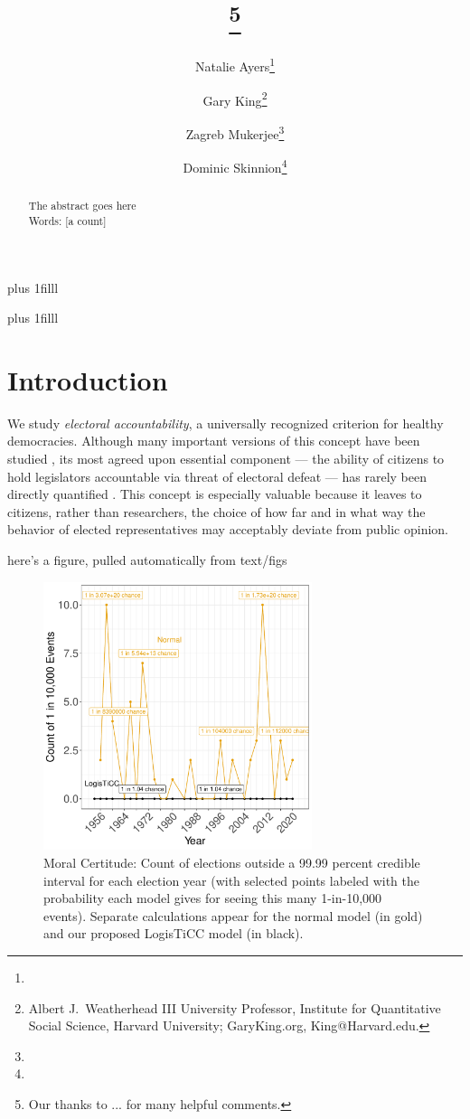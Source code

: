 \documentclass[12pt]{article}
\title{\titl}
\title{\titl\thanks{Our thanks to ... for many helpful comments.}}
\author{Natalie Ayers\thanks{}\and Gary King\thanks{Albert J.\ Weatherhead
III University Professor, Institute for Quantitative Social
Science, Harvard University; GaryKing.org, King@Harvard.edu.}\and Zagreb Mukerjee\thanks{} \and Dominic Skinnion\thanks{}}
\newcommand{\btVFill}{\vskip0pt plus 1filll}
\theoremstyle{definition}
\begin{document}
\maketitle\thispagestyle{empty}\setcounter{page}{0}
\btVFill
\vspace{-2\baselineskip}
\begin{abstract}
  \noindent The abstract goes here \\
  \newline
\noindent Words: [a count] 
\end{abstract}
\btVFill
\clearpage
{}\baselineskip

\section{Introduction}\label{s:intro}

We study \emph{electoral accountability}, a universally recognized criterion for healthy democracies. Although many important versions of this concept have been studied \citep{CanBraCog02, AnsJon10, HirSny12, NyhMcgSid12, TauWar18, FraHer2018, AnsKur22, FouHal22, IarLopMei22}, its most agreed upon essential component --- the ability of citizens to hold legislators accountable via threat of electoral defeat --- has rarely been directly quantified \citep{PrzAlv00}. This concept is especially valuable because it leaves to citizens, rather than researchers, the choice of how far and in what way the behavior of elected representatives may acceptably deviate from public opinion.


here's a figure, pulled automatically from text/figs
\begin{figure}[tbhp]
  \centering
  \includegraphics[width=0.7\textwidth]{moralcertitude_oya}
  \caption{Moral Certitude: Count of elections outside a 99.99
    percent credible interval for each election year (with selected points
    labeled with the probability each model gives for seeing this
    many 1-in-10,000 events). Separate calculations appear for the
    normal model (in gold) and our proposed LogisTiCC model (in black).}
  \label{moral}
\end{figure}
\end{document}
